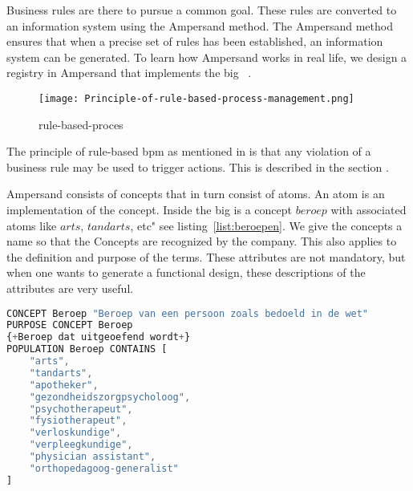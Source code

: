 Business rules are there to pursue a common goal.
These rules are converted to an information system using the Ampersand method.
The Ampersand method ensures that when a precise set of rules has been established, an information system can be generated.
To learn how Ampersand works in real life, we design a registry in Ampersand that implements the \acrshort{big}~ .

\begin{wrapfigure} {r}{0.52\textwidth} 
\texttt{[image: Principle-of-rule-based-process-management.png]}
\caption{rule-based-proces}
\label{fig:rule-based-proces}
\end{wrapfigure}


The principle of rule-based \acrfull{bpm} as mentioned in  is that any violation of a business rule may be used to trigger actions. 
This is described in the section .

Ampersand consists of concepts that in turn consist of atoms.
An atom is an implementation of the concept.
Inside the \acrshort{big} is a concept $beroep$ with associated atoms like $arts$, $tandarts$, etc" see listing~\ref{list:beroepen}.
We give the concepts a name so that the Concepts are recognized by the company.
This also applies to the definition and purpose of the terms.
These attributes are not mandatory, but when one wants to generate a functional design, these descriptions of the attributes are very useful.
\begin{lstlisting}[language=Octave, caption={Listing Concept Beroep},captionpos=b, label={list:beroepen}]
CONCEPT Beroep "Beroep van een persoon zoals bedoeld in de wet" 
PURPOSE CONCEPT Beroep 
{+Beroep dat uitgeoefend wordt+}
POPULATION Beroep CONTAINS [
    "arts",
    "tandarts",
    "apotheker",
    "gezondheidszorgpsycholoog",
    "psychotherapeut",
    "fysiotherapeut",
    "verloskundige",
    "verpleegkundige",
    "physician assistant",
    "orthopedagoog-generalist"
]
\end{lstlisting}

